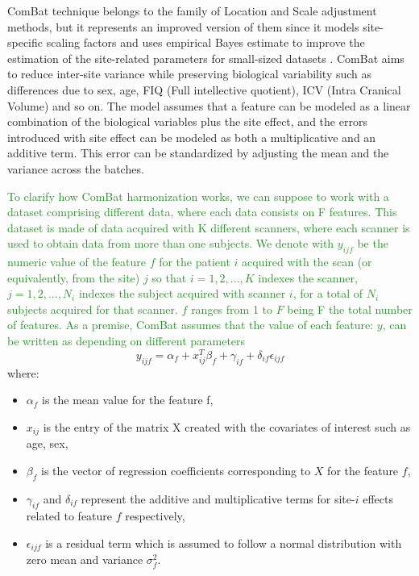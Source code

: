 \documentclass[11pt]{report}
\begin{document}
ComBat technique belongs to the family of Location and Scale adjustment methods, but it represents an improved version of them since it models site-specific scaling factors and uses empirical Bayes estimate to improve the estimation of the site-related parameters for small-sized datasets \cite{fortin-2018}.
ComBat aims to reduce inter-site variance while preserving biological variability such as differences due to sex, age, FIQ (Full intellective quotient), ICV (Intra Cranical Volume) and so on.
The model assumes that a feature can be modeled as a linear combination of the biological variables plus the site effect, and the errors introduced with site effect can be modeled as both a multiplicative and an additive term. This error can be standardized by adjusting the mean and the variance across the batches.

\textcolor{ForestGreen}{
To clarify how ComBat harmonization works, we can suppose to work with a dataset comprising different data, where each data consists on F features.
This dataset is made of data acquired with K different scanners, where each scanner is used to obtain data from more than one subjects.
We denote with $y_{ijf}$ be the numeric value of the feature $f$ for the patient $i$ acquired with the scan (or equivalently, from the site) $j$
so that $i = 1, 2, ..., K$ indexes the scanner, $j = 1, 2, ..., N_i$ indexes the subject acquired with scanner $i$, for a total of $N_i$ subjects acquired for that scanner. $f$ ranges from 1 to $F$ being F the total number of features.
As a premise, ComBat assumes that the value of each feature: $y$, can be written as depending on different parameters
}
\begin{equation}
y_{ijf} = \alpha_f + x_{ij}^T \beta _f + \gamma_{if} + \delta_{if} \epsilon_{ijf}
\end{equation}
where:
\begin{itemize}
\item $\alpha_f$ is the mean value for the feature f,
\item $x_{ij}$ is the entry of the matrix X created with the covariates of interest such as age, sex,
\item $\beta_f$ is the vector of regression coefficients corresponding to $X$ for the feature $f$,
\item $\gamma_{if}$ and $\delta_{if}$ represent the additive and multiplicative terms for site-$i$ effects related to feature $f$ respectively,
\item $\epsilon_{ijf}$ is a residual term which is assumed to follow a normal distribution with zero mean and variance $\sigma_f^2$.
\end{itemize}
\end{document}
